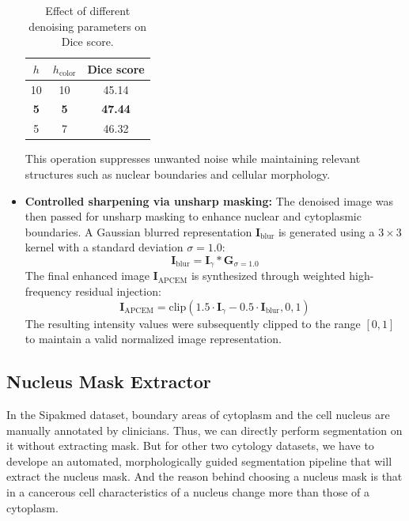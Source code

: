 \documentclass[pdflatex,sn-nature]{sn-jnl}%
\theoremstyle{thmstyleone}%
\theoremstyle{thmstyletwo}%
\theoremstyle{thmstylethree}%
\begin{document}
\begin{itemize}
  \begin{table}[ht]
    \centering
     \caption{Effect of different denoising parameters on Dice score.}
    \label{tab:denoising_parameters}
    \begin{tabular}{|c|c|c|}
        \hline
        $h$ & $h_{\mathrm{color}}$ & Dice score \\ \hline
        10 & 10 & 45.14 \\ \hline
        \textbf{5} & \textbf{5} & \textbf{47.44} \\ \hline
        5 & 7 & 46.32 \\ \hline
    \end{tabular}
\end{table}

     This operation suppresses unwanted noise while maintaining relevant structures such as nuclear boundaries and cellular morphology. 
    
    \item \textbf{Controlled sharpening via unsharp masking:} The denoised image was then passed for unsharp masking to enhance nuclear and cytoplasmic boundaries.  A Gaussian blurred representation $\mathbf{I}_{\text{blur}}$ is generated using a $3 \times 3$ kernel with a standard deviation $\sigma = 1.0$:$$\mathbf{I}_{\text{blur}} = \mathbf{I}_{\gamma} * \mathbf{G}_{\sigma=1.0}$$The final enhanced image $\mathbf{I}_{\text{APCEM}}$ is synthesized through weighted high-frequency residual injection:$$\mathbf{I}_{\text{APCEM}} = \text{clip}\left(1.5 \cdot \mathbf{I}_{\gamma} - 0.5 \cdot \mathbf{I}_{\text{blur}}, 0, 1\right)$$
    The resulting intensity values were subsequently clipped to the range $[0,1]$ to maintain a valid normalized image representation.
\end{itemize}

\subsection{Nucleus Mask Extractor}
In the Sipakmed dataset, boundary areas of cytoplasm and the cell nucleus are manually annotated by clinicians. Thus, we can directly perform segmentation on it without extracting mask. But for other two cytology datasets, we have to develope an automated, morphologically guided segmentation pipeline that will extract the nucleus mask. And the reason behind choosing a nucleus mask is that in a cancerous cell characteristics of a nucleus change more than those of a cytoplasm. 
\end{document}
